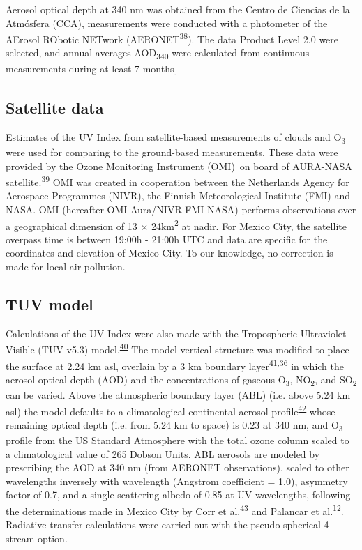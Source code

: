 \documentclass[10pt]{article}
\begin{document}
Aerosol optical depth at 340 nm was obtained from the Centro de Ciencias
de la Atmósfera (CCA), measurements were conducted with a photometer of
the AErosol RObotic NETwork (AERONET\textsuperscript{\hyperref[csl:38]{38}}). The data
Product Level 2.0 were selected, and annual averages
AOD\textsubscript{340} were calculated from continuous measurements
during at least 7 months\textsubscript{.}

\subsection*{Satellite data}

{\label{800866}}

Estimates of the UV Index from satellite-based measurements of clouds
and O\textsubscript{3} were used for comparing to the ground-based
measurements. These data were provided by the Ozone Monitoring
Instrument (OMI)~on board of AURA-NASA satellite.\textsuperscript{\hyperref[csl:39]{39}} OMI
was created in cooperation between the Netherlands Agency for Aerospace
Programmes (NIVR), the Finnish Meteorological Institute (FMI) and NASA.
OMI (hereafter OMI-Aura/NIVR-FMI-NASA) performs observations over a
geographical dimension of 13 × 24km\textsuperscript{2} at nadir. For
Mexico City, the satellite overpass time is between 19:00h - 21:00h UTC
and data are specific for the coordinates and elevation of Mexico City.
To our knowledge, no correction is made for local air pollution.

\subsection*{TUV model}

{\label{308972}}

Calculations of the UV Index were also made with the Tropospheric
Ultraviolet Visible (TUV v5.3) model.\textsuperscript{\hyperref[csl:40]{40}} The model
vertical structure was modified to place the surface at 2.24 km asl,
overlain by a 3 km boundary layer\textsuperscript{\hyperref[csl:41]{41},\hyperref[csl:36]{36}} in which the aerosol
optical depth (AOD) and the concentrations of gaseous
O\textsubscript{3}, NO\textsubscript{2}, and SO\textsubscript{2} can be
varied. Above the atmospheric boundary layer (ABL) (i.e. above 5.24 km
asl) the model defaults to a climatological continental aerosol
profile\textsuperscript{\hyperref[csl:42]{42}} whose remaining optical depth (i.e. from 5.24
km to space) is 0.23 at 340 nm, and O\textsubscript{3} profile from the
US Standard Atmosphere with the total ozone column scaled to a
climatological value of 265 Dobson Units. ABL aerosols are modeled by
prescribing the AOD at 340 nm (from AERONET observations), scaled to
other wavelengths inversely with wavelength (Angstrom coefficient =
1.0), asymmetry factor of 0.7, and a single scattering albedo of 0.85 at
UV wavelengths, following the determinations made in Mexico City by Corr
et al.\textsuperscript{\hyperref[csl:43]{43}} and Palancar et al.\textsuperscript{\hyperref[csl:12]{12}}.
Radiative transfer calculations were carried out with the
pseudo-spherical 4-stream option.
\end{document}
